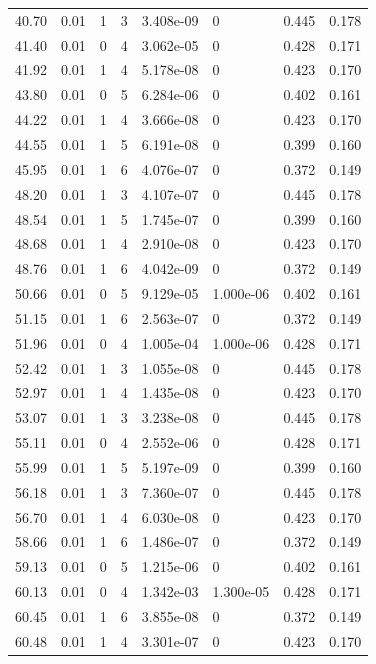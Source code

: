 \documentclass[preview]{standalone}
\begin{document}
{{{\begin{tabular}{L{1.2cm}C{1.2cm} C{0.3cm}C{0.5cm} C{1.4cm}C{1.4cm} C{1.4cm}C{1.4cm}}
  40.70  &  0.01  & 1     &  3 &  3.408e-09  & 0  & 0.445 &  0.178   \\ 
  41.40  &  0.01  & 0     &  4 &  3.062e-05  & 0  & 0.428 &  0.171   \\ 
  41.92  &  0.01  & 1     &  4 &  5.178e-08  & 0  & 0.423 &  0.170   \\ 
  43.80  &  0.01  & 0     &  5 &  6.284e-06  & 0  & 0.402 &  0.161   \\ 
  44.22  &  0.01  & 1     &  4 &  3.666e-08  & 0  & 0.423 &  0.170   \\ 
  44.55  &  0.01  & 1     &  5 &  6.191e-08  & 0  & 0.399 &  0.160   \\ 
  45.95  &  0.01  & 1     &  6 &  4.076e-07  & 0  & 0.372 &  0.149   \\ 
  48.20  &  0.01  & 1     &  3 &  4.107e-07  & 0  & 0.445 &  0.178   \\ 
  48.54  &  0.01  & 1     &  5 &  1.745e-07  & 0  & 0.399 &  0.160   \\ 
  48.68  &  0.01  & 1     &  4 &  2.910e-08  & 0  & 0.423 &  0.170   \\ 
  48.76  &  0.01  & 1     &  6 &  4.042e-09  & 0  & 0.372 &  0.149   \\ 
  50.66  &  0.01  & 0     &  5 &  9.129e-05  & 1.000e-06  & 0.402 &  0.161   \\ 
  51.15  &  0.01  & 1     &  6 &  2.563e-07  & 0  & 0.372 &  0.149   \\ 
  51.96  &  0.01  & 0     &  4 &  1.005e-04  & 1.000e-06  & 0.428 &  0.171   \\ 
  52.42  &  0.01  & 1     &  3 &  1.055e-08  & 0  & 0.445 &  0.178   \\ 
  52.97  &  0.01  & 1     &  4 &  1.435e-08  & 0  & 0.423 &  0.170   \\ 
  53.07  &  0.01  & 1     &  3 &  3.238e-08  & 0  & 0.445 &  0.178   \\ 
  55.11  &  0.01  & 0     &  4 &  2.552e-06  & 0  & 0.428 &  0.171   \\ 
  55.99  &  0.01  & 1     &  5 &  5.197e-09  & 0  & 0.399 &  0.160   \\ 
  56.18  &  0.01  & 1     &  3 &  7.360e-07  & 0  & 0.445 &  0.178   \\ 
  56.70  &  0.01  & 1     &  4 &  6.030e-08  & 0  & 0.423 &  0.170   \\ 
  58.66  &  0.01  & 1     &  6 &  1.486e-07  & 0  & 0.372 &  0.149   \\ 
  59.13  &  0.01  & 0     &  5 &  1.215e-06  & 0  & 0.402 &  0.161   \\ 
  60.13  &  0.01  & 0     &  4 &  1.342e-03  & 1.300e-05  & 0.428 &  0.171   \\ 
  60.45  &  0.01  & 1     &  6 &  3.855e-08  & 0  & 0.372 &  0.149   \\ 
  60.48  &  0.01  & 1     &  4 &  3.301e-07  & 0  & 0.423 &  0.170   \\ 
\hline 
\end{tabular} 

}}}
\end{document}

